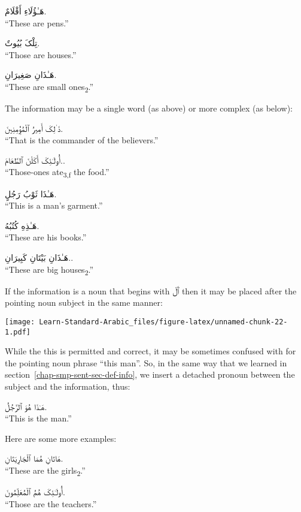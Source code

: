 \documentclass[
  10pt,
]{book}
\begin{document}
\foreignlanguage{arabic}{هَـٰؤُلَاءِ أَقْلَامٌ.}\\
\enquote{These are pens.}

\foreignlanguage{arabic}{تِلْکَ بُيُوتٌ.}\\
\enquote{Those are houses.}

\foreignlanguage{arabic}{هَـٰذَانِ صَغِيرَانِ.}\\
\enquote{These are small ones\textsubscript{2}.}

The information may be a single word (as above) or more complex (as below):

\foreignlanguage{arabic}{ذَ~ٰلِکَ أَمِيرُ ٱلْمُؤِْمِنِينَ.}\\
\enquote{That is the commander of the believers.}

\foreignlanguage{arabic}{أُولَـٰئِکَ أَکَلْنَ ٱلطَّعَامَ..}\\
\enquote{Those-ones ate\textsubscript{3,f} the food.}

\foreignlanguage{arabic}{هَـٰذَا ثَوْبُ رَجُلٍ.}\\
\enquote{This is a man's garment.}

\foreignlanguage{arabic}{هَـٰذِهِ کُتُبُهُ.}\\
\enquote{These are his books.}

\foreignlanguage{arabic}{هَـٰذَانِ بَيْتَانِ کَبِيرَانِ..}\\
\enquote{These are big houses\textsubscript{2}.}

If the information is a noun that begins with \foreignlanguage{arabic}{ٱَلْ} then it may be placed after the pointing noun subject in the same manner:

\texttt{[image: Learn-Standard-Arabic\_files/figure-latex/unnamed-chunk-22-1.pdf]}

While the this is permitted and correct, it may be sometimes confused with for the pointing noun phrase \enquote{this man}. So, in the same way that we learned in
section~\ref{chap-smp-sent-sec-def-info},
we insert a detached pronoun between the subject and the information, thus:

\foreignlanguage{arabic}{هَـٰذَا هُوَ ٱلرَّجُلُ.}\\
\enquote{This is the man.}

Here are some more examples:

\foreignlanguage{arabic}{هَاتَانِ هُمَا ٱلْجَارِيَتَانِ.}\\
\enquote{These are the girls\textsubscript{2}.}

\foreignlanguage{arabic}{أُولَـٰئِکَ هُمُ ٱلْمُعَلِّمُونَ.}\\
\enquote{Those are the teachers.}
\end{document}
